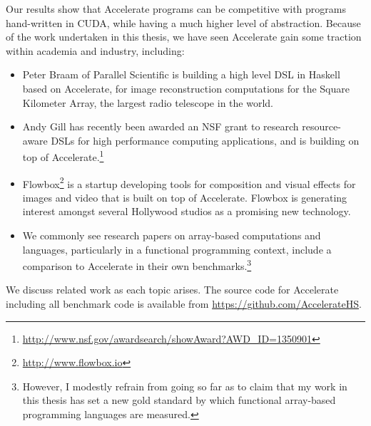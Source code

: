 Our results show that Accelerate programs can be competitive with programs
hand-written in CUDA, while having a much higher level of abstraction. Because
of the work undertaken in this thesis, we have seen Accelerate gain some
traction within academia and industry, including:

\begin{itemize}
    \item Peter Braam of Parallel Scientific is building a high level DSL in
        Haskell based on Accelerate, for image reconstruction computations for
        the Square Kilometer Array, the largest radio telescope in the world.

    \item Andy Gill has recently been awarded an NSF grant to research
        resource-aware DSLs for high performance computing applications, and is
        building on top of Accelerate.\footnote{\url{http://www.nsf.gov/awardsearch/showAward?AWD_ID=1350901}}

    \item Flowbox\footnote{\url{http://www.flowbox.io}} is a startup developing
        tools for composition and visual effects for images and video that is
        built on top of Accelerate. Flowbox is generating interest amongst
        several Hollywood studios as a promising new technology.


    \item We commonly see research papers on array-based computations and
        languages, particularly in a functional programming context, include a
        comparison to Accelerate in their own benchmarks.\footnote{However, I
        modestly refrain from going so far as to claim that my work in this
        thesis has set a new gold standard by which functional array-based
        programming languages are measured.}

\end{itemize}

We discuss related work as each topic arises. The source code for Accelerate
including all benchmark code is available from
\url{https://github.com/AccelerateHS}.


